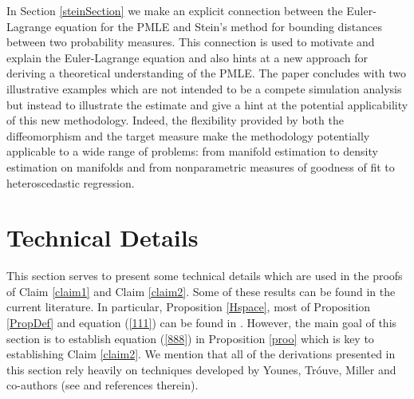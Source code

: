 \documentclass[noinfoline]{imsart}
\begin{document}
In Section \ref{steinSection} we make an explicit connection between the Euler-Lagrange equation for the PMLE and Stein's method for bounding distances between two probability measures. 
This connection is used to motivate and explain the Euler-Lagrange equation and also hints at a new approach for deriving a theoretical understanding of the PMLE.
The paper concludes with  two illustrative examples which are not intended to be a compete simulation analysis but instead to illustrate the estimate and give a hint at the potential applicability of this new methodology. Indeed, the flexibility provided by both the diffeomorphism and the target measure make the methodology potentially applicable to a wide range of problems: 
from manifold estimation to density estimation on manifolds and from nonparametric measures of goodness of fit to
 heteroscedastic regression.




\appendix



\section{Technical Details}
\label{TD}


This section serves to present some technical details which are used  in the proofs of Claim \ref{claim1} and Claim \ref{claim2}.   Some of these results can be found in the current literature. In particular,  Proposition \ref{Hspace}, most of Proposition \ref{PropDef} and equation (\ref{111}) can be found in \cite{you:10}.   However, the main goal of this section is to establish  equation (\ref{888}) in Proposition \ref{proo}  which is key to establishing Claim \ref{claim2}. 
We mention that all of the derivations presented in this section rely heavily on techniques developed by  Younes, Tr\'ouve, Miller and co-authors (see \cite{you:10} and references therein).
\end{document}
